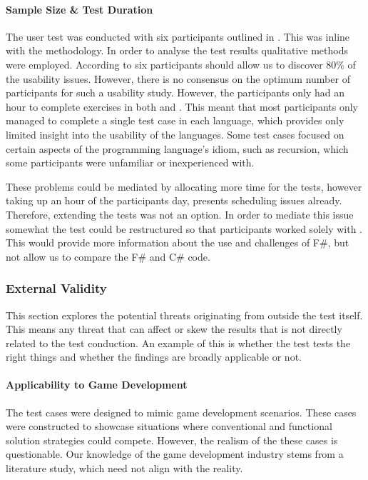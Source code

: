 \paragraph{Sample Size \& Test Duration}
The user test was conducted with six participants outlined in . This was inline with the \champagne methodology. In order to analyse the test results qualitative methods were employed. According to \cite{virzi1992refining} six participants should allow us to discover 80\% of the usability issues. However, there is no consensus on the optimum number of participants for such a usability study\cite{hwang2010number}. However, the participants only had an hour to complete exercises in both \fs and \cs. This meant that most participants only managed to complete a single test case in each language, which provides only limited insight into the usability of the languages. Some test cases focused on certain aspects of the programming language's idiom, such as recursion, which some participants were unfamiliar or inexperienced with.

These problems could be mediated by allocating more time for the tests, however taking up an hour of the participants day, presents scheduling issues already. Therefore, extending the tests was not an option. In order to mediate this issue somewhat the test could be restructured so that participants worked solely with \fs. This would provide more information about the use and challenges of F\#, but not allow us to compare the F\# and C\# code.

\subsubsection{External Validity}
This section explores the potential threats originating from outside the test itself. This means any threat that can affect or skew the results that is not directly related to the test conduction. An example of this is whether the test tests the right things and whether the findings are broadly applicable or not.

\paragraph{Applicability to Game Development}
The test cases were designed to mimic game development scenarios. These cases were constructed to showcase situations where conventional and functional solution strategies could compete. However, the realism of the these cases is questionable. Our knowledge of the game development industry stems from a literature study, which need not align with the reality.

